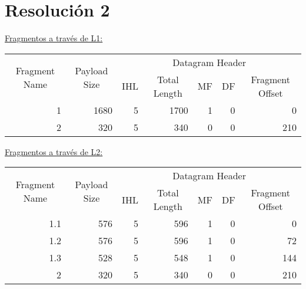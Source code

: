 \section*{Resolución 2}

\noindent
\underline{Fragmentos a través de L1:}

\begin{table}[H]
    \renewcommand{\arraystretch}{1.5}
    \centering
    \begin{tabular}{|c|c|crrrr|}
    \hline
    \multirow{2}{*}{Fragment Name} & \multirow{2}{*}{Payload Size} & \multicolumn{5}{c|}{Datagram Header} \\ \cline{3-7} 
     &  & \multicolumn{1}{c|}{IHL} & \multicolumn{1}{c|}{Total Length} & \multicolumn{1}{c|}{MF} & \multicolumn{1}{c|}{DF} & \multicolumn{1}{c|}{Fragment Offset} \\ \hline
    \multicolumn{1}{|r|}{1} & \multicolumn{1}{r|}{1680} & \multicolumn{1}{r|}{5} & \multicolumn{1}{r|}{1700} & \multicolumn{1}{r|}{1} & \multicolumn{1}{r|}{0} & 0 \\ \hline
    \multicolumn{1}{|r|}{2} & \multicolumn{1}{r|}{320} & \multicolumn{1}{r|}{5} & \multicolumn{1}{r|}{340} & \multicolumn{1}{r|}{0} & \multicolumn{1}{r|}{0} & 210 \\ \hline
    \end{tabular}
\end{table}


\noindent
\underline{Fragmentos a través de L2:}

\begin{table}[H]
    \renewcommand{\arraystretch}{1.5}
    \centering
    \begin{tabular}{|r|r|rrrrr|}
    \hline
    \multicolumn{1}{|c|}{\multirow{2}{*}{Fragment Name}} & \multicolumn{1}{c|}{\multirow{2}{*}{Payload Size}} & \multicolumn{5}{c|}{Datagram Header} \\ \cline{3-7} 
    \multicolumn{1}{|c|}{} & \multicolumn{1}{c|}{} & \multicolumn{1}{c|}{IHL} & \multicolumn{1}{c|}{Total Length} & \multicolumn{1}{c|}{MF} & \multicolumn{1}{c|}{DF} & \multicolumn{1}{c|}{Fragment Offset} \\ \hline
    1.1 & 576 & \multicolumn{1}{r|}{5} & \multicolumn{1}{r|}{596} & \multicolumn{1}{r|}{1} & \multicolumn{1}{r|}{0} & 0 \\ \hline
    1.2 & 576 & \multicolumn{1}{r|}{5} & \multicolumn{1}{r|}{596} & \multicolumn{1}{r|}{1} & \multicolumn{1}{r|}{0} & 72 \\ \hline
    1.3 & 528 & \multicolumn{1}{r|}{5} & \multicolumn{1}{r|}{548} & \multicolumn{1}{r|}{1} & \multicolumn{1}{r|}{0} & 144 \\ \hline
    2 & 320 & \multicolumn{1}{r|}{5} & \multicolumn{1}{r|}{340} & \multicolumn{1}{r|}{0} & \multicolumn{1}{r|}{0} & 210 \\ \hline
    \end{tabular}
\end{table}



